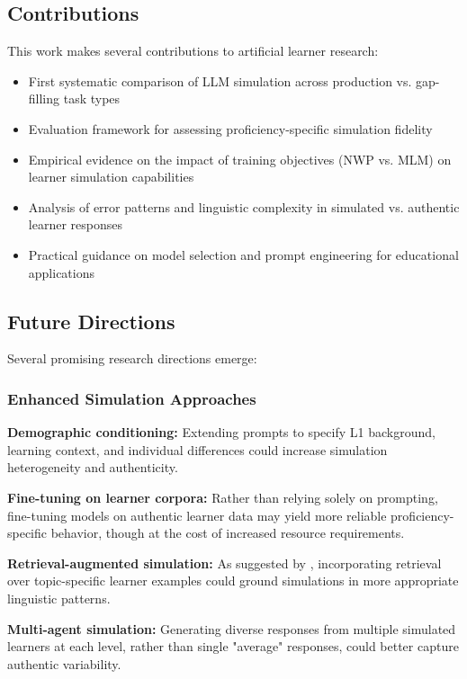 \subsection{Contributions}

This work makes several contributions to artificial learner research:

\begin{itemize}
    \item First systematic comparison of LLM simulation across production vs. gap-filling task types
    \item Evaluation framework for assessing proficiency-specific simulation fidelity
    \item Empirical evidence on the impact of training objectives (NWP vs. MLM) on learner simulation capabilities
    \item Analysis of error patterns and linguistic complexity in simulated vs. authentic learner responses
    \item Practical guidance on model selection and prompt engineering for educational applications
\end{itemize}

\subsection{Future Directions}

Several promising research directions emerge:

\subsubsection{Enhanced Simulation Approaches}

\textbf{Demographic conditioning:} Extending prompts to specify L1 background, learning context, and individual differences could increase simulation heterogeneity and authenticity.

\textbf{Fine-tuning on learner corpora:} Rather than relying solely on prompting, fine-tuning models on authentic learner data may yield more reliable proficiency-specific behavior, though at the cost of increased resource requirements.

\textbf{Retrieval-augmented simulation:} As suggested by \citet{benedetto2024using}, incorporating retrieval over topic-specific learner examples could ground simulations in more appropriate linguistic patterns.

\textbf{Multi-agent simulation:} Generating diverse responses from multiple simulated learners at each level, rather than single "average" responses, could better capture authentic variability.

